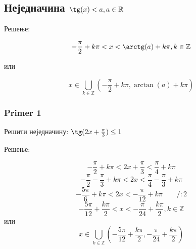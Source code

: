 \documentclass[../diplomski.tex]{subfiles}
\begin{document}
\subsection{Неједначина $\tg(x)<a,a\in\mathbb{R}$}

Решење:



\[-\frac{\pi}{2}+k\pi<x<\arctg(a)+k\pi,k\in\mathbb{Z}\]
\centerline{или}
\[x\in\bigcup_{k\in\mathbb{Z}}\left(-\frac{\pi}{2}+k\pi,\arctan(a)+k\pi\right)\]

\subsubsection{Primer 1}

Решити неједначину: $\tg(2x+\frac{\pi}{3})\le1$

Решење:



\[-\frac{\pi}{2}+k\pi<2x+\frac{\pi}{3}<\frac{\pi}{4}+k\pi\]
\[-\frac{\pi}{2}-\frac{\pi}{3}+k\pi<2x<\frac{\pi}{4}-\frac{\pi}{3}+k\pi\]
\[-\frac{5\pi}{6}+k\pi<2x<-\frac{\pi}{12}+k\pi\qquad/:2\]
\[-\frac{5\pi}{12}+\frac{k\pi}{2}<x<-\frac{\pi}{24}+\frac{k\pi}{2},k\in\mathbb{Z}\]
или
\[x\in\bigcup_{k\in\mathbb{Z}}\left(-\frac{5\pi}{12}+\frac{k\pi}{2},-\frac{\pi}{24}+\frac{k\pi}{2}\right)\]
\end{document}
